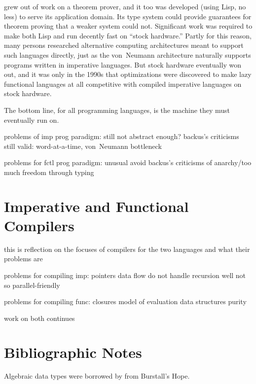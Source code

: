 \ML grew out of work on a theorem prover, and it too was developed (using Lisp, no less) to serve its application domain. Its type system could provide guarantees for theorem proving that a weaker system could not. Significant work was required to make both Lisp and \ML run decently fast on ``stock hardware.'' Partly for this reason, many persons researched alternative computing architectures meant to support such languages directly, just as the von~Neumann architecture naturally supports programs written in imperative languages. But stock hardware eventually won out, and it was only in the 1990s that optimizations were discovered to make lazy functional languages at all competitive with compiled imperative languages on stock hardware.

The bottom line, for all programming languages, is the machine they must eventually run on. 

problems of imp prog paradigm:
still not abstract enough?
backus's criticisms still valid: word-at-a-time, von~Neumann bottleneck

problems for fctl prog paradigm:
unusual
avoid backus's criticisms of anarchy/too much freedom through typing

\section{Imperative and Functional Compilers}
this is reflection on the focuses of compilers for the two languages and what their problems are

problems for compiling imp:
pointers
data flow
do not handle recursion well
not so parallel-friendly

problems for compiling func:
closures
model of evaluation
data structures
purity

work on both continues

\section{Bibliographic Notes}
Algebraic data types were borrowed by \ML from Burstall's Hope.